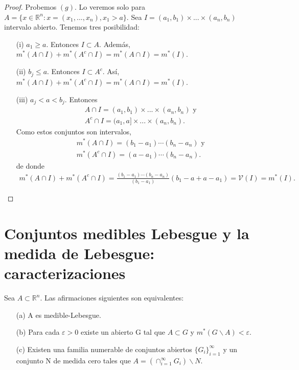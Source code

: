 \begin{proof}
    Probemos $(g)$. Lo veremos solo para $A = \{x \in \mathbb{R}^n : x = (x_1,...,x_n), x_1 > a\}$. Sea $I = (a_1,b_1)\times ... \times (a_n,b_n)$ intervalo abierto. Tenemos tres posibilidad:
    \begin{enumerate}
        \item[(i)] $a_1 \ge a$. Entonces $I \subset A$. Además, $m^*(A \cap I) + m^*(A^c \cap I) = m^*(A \cap I) = m^*(I)$.
        \item[(ii)] $b_j \leq a$. Entonces $I \subset A^c$. Así, $m^*(A \cap I) + m^*(A^c \cap I) = m^*(A \cap I) = m^*(I)$.
        \item[(iii)] $a_j < a < b_j$. Entonces
              \begin{align*}
                   & A \cap I = (a_1,b_1) \times ... \times (a_n,b_n) \text{ y } \\
                   & A^c \cap I =  (a_1,a] \times ... \times (a_n,b_n).
              \end{align*}
              Como estos conjuntos son intervalos,
              \begin{align*}
                   & m^*(A \cap I) = (b_1 - a_1) \dotsb (b_n - a_n) \text{ y } \\
                   & m^*(A^c \cap I) = (a - a_1) \dotsb (b_n - a_n).
              \end{align*}
              de donde
              \begin{align*}
                  m^*(A \cap I) + m^*(A^c \cap I) = \frac{(b_1 - a_1)\dotsb (b_n - a_n)}{(b_1 - a_1)}(b_1 - a + a - a_1) = \mathcal{V}(I) = m^*(I).
              \end{align*}
    \end{enumerate}
\end{proof}

\newpage
\section{Conjuntos medibles Lebesgue y la medida de Lebesgue: caracterizaciones}

\begin{teo}
    Sea $A \subset \mathbb{R}^n$. Las afirmaciones siguientes son equivalentes:
    \begin{enumerate}
        \item[(a)] A es medible-Lebesgue.
        \item[(b)] Para cada $\varepsilon > 0$ existe un abierto G tal que $A \subset G$ y $m^*(G \backslash A) < \varepsilon$.
        \item[(c)] Existen una familia numerable de conjuntos abiertos $\{G_i\}_{i=1}^{\infty}$ y un conjunto N de medida cero tales que $A = (\cap_{i=1}^{\infty}{G_i}) \backslash N$.
    \end{enumerate}
\end{teo}

